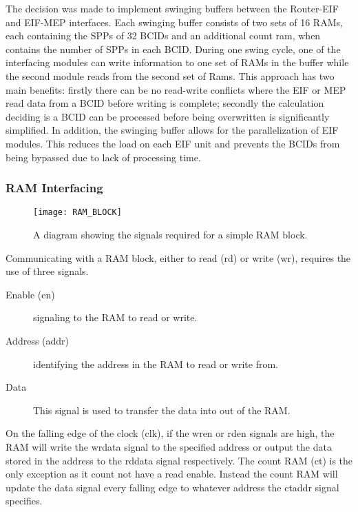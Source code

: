 		The decision was made to implement swinging buffers between the Router-EIF and EIF-MEP interfaces.
		Each swinging buffer consists of two sets of 16 RAMs, each containing the SPPs of 32 BCIDs and an additional count ram, when contains the number of SPPs in each BCID.
		During one swing cycle, one of the interfacing modules can write information to one set of RAMs in the buffer while the second module reads from the second set of Rams.
		This approach has two main benefits: firstly there can be no read-write conflicts where the EIF or MEP read data from a BCID before writing is complete; secondly the calculation deciding is a BCID can be processed before being overwritten is significantly simplified.
		In addition, the swinging buffer allows for the parallelization of EIF modules.
		This reduces the load on each EIF unit and prevents the BCIDs from being bypassed due to lack of processing time.

		\subsubsection{RAM Interfacing} %
		\label{sub:ram_interfacing}
			
			\begin{figure}[ht]
				\centering
				\texttt{[image: RAM\_BLOCK]}
				\caption{A diagram showing the signals required for a simple RAM block.}
				\label{fig:ram_diagram}
			\end{figure}

			Communicating with a RAM block, either to read (rd) or write (wr), requires the use of three signals.

			\begin{description}
				\item [Enable (en)] signaling to the RAM to read or write.
				\item [Address (addr)] identifying the address in the RAM to read or write from.
				\item [Data] This signal is used to transfer the data into out of the RAM.
			\end{description}

			On the falling edge of the clock (clk), if the wr\textunderscore en or rd\textunderscore en signals are high, the RAM will write the wr\textunderscore data signal to the specified address or output the data stored in the address to the rd\textunderscore data signal respectively. 
			The count RAM (ct) is the only exception as it count not have a read enable.
			Instead the count RAM will update the data signal every falling edge to whatever address the ct\textunderscore addr signal specifies.

